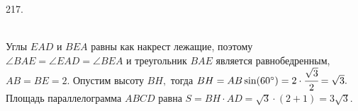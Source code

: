 217. \begin{figure}[ht!]
\end{figure}\\
Углы $EAD$ и $BEA$ равны как накрест лежащие, поэтому $\angle BAE=\angle EAD=\angle BEA$ и треугольник $BAE$ является равнобедренным, $AB=BE=2.$ Опустим высоту $BH,$ тогда $BH=AB\sin(60^\circ)=2\cdot\cfrac{\sqrt{3}}{2}=\sqrt{3}.$ Площадь параллелограмма $ABCD$ равна $S=BH\cdot AD=\sqrt{3}\cdot(2+1)=3\sqrt{3}.$\\
